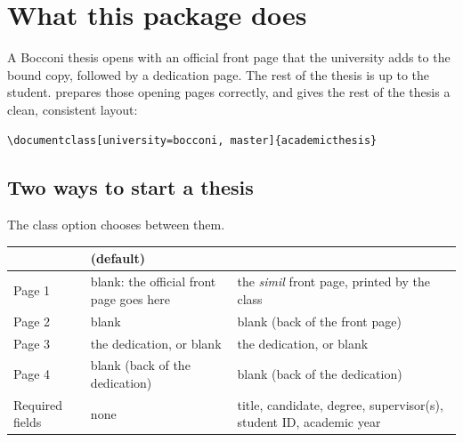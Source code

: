 \documentclass[11pt,a4paper,oneside]{report}
\begin{document}

{\setlength{\parskip}{0pt}\tableofcontents}


\chapter{What this package does}

A Bocconi thesis opens with an official front page that the university
adds to the bound copy, followed by a dedication page. The rest of the
thesis is up to the student.  prepares those opening
pages correctly, and gives the rest of the thesis a clean, consistent
layout:

\begin{lstlisting}
\documentclass[university=bocconi, master]{academicthesis}
\end{lstlisting}

\section{Two ways to start a thesis}

The class option  chooses between them.

\begin{tabularx}{\textwidth}{@{}l Y Y@{}}
\toprule
& \textbf{} (default) & \textbf{} \\
\midrule
Page 1 & blank: the official front page goes here & the \emph{simil} front page, printed by the class \\
Page 2 & blank & blank (back of the front page) \\
Page 3 & the dedication, or blank & the dedication, or blank \\
Page 4 & blank (back of the dedication) & blank (back of the dedication) \\
Required fields & none & title, candidate, degree, supervisor(s), student ID, academic year \\
\bottomrule
\end{tabularx}
\end{document}
